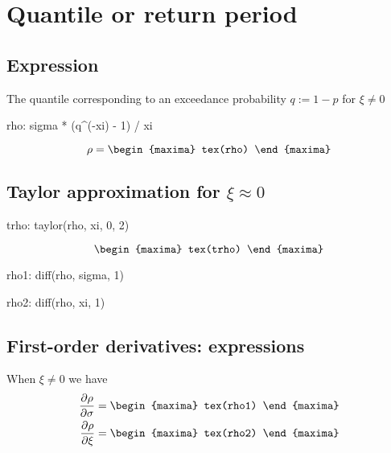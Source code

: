 \section{Quantile or return period}
\subsection{Expression}
The quantile corresponding to an exceedance probability $q := 1 -p$ for $\xi \neq 0$
\begin{maxima}
  rho: sigma * (q^(-xi) - 1) / xi
\end{maxima}
\[
\rho=
\begin{maxima}
 tex(rho)
\end{maxima}
\]


\subsection{Taylor approximation for $\xi \approx 0$}
\begin{maxima}
 trho: taylor(rho, xi, 0, 2)
\end{maxima}

{\color{MonVertF}
  \begin{equation}
    \label{eq:Trho}
    \begin{maxima}
      tex(trho)
    \end{maxima}
  \end{equation}
}

\begin{maxima}
  rho1: diff(rho, sigma, 1)
\end{maxima}
\begin{maxima}
  rho2: diff(rho, xi, 1)
\end{maxima}


\subsection{First-order derivatives: expressions}
When $\xi \neq 0$ we have
{\color{MonVertF}
\begin{align*}
\frac{\partial \rho}{\partial \sigma}  &=
\begin{maxima}
 tex(rho1)
\end{maxima}
\\
\frac{\partial \rho}{\partial \xi} &=
\begin{maxima}
 tex(rho2)
\end{maxima}
\end{align*}
}


